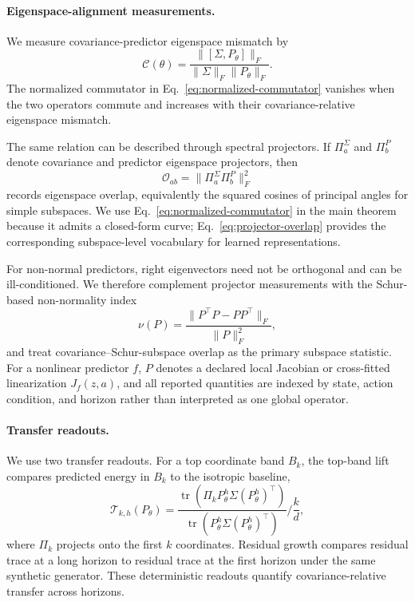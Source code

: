 \documentclass{article}
\DeclareMathOperator{\tr}{tr}
\newcommand{\comm}[2]{[#1,#2]}
\begin{document}
\paragraph{Eigenspace-alignment measurements.}
We measure covariance-predictor eigenspace mismatch by
\begin{equation}
\mathcal{C}(\theta)=
\frac{\|\comm{\Sigma}{P_\theta}\|_F}
{\|\Sigma\|_F\|P_\theta\|_F}.
\label{eq:normalized-commutator}
\end{equation}
The normalized commutator in Eq.~\eqref{eq:normalized-commutator} vanishes when the two operators commute and increases with their covariance-relative eigenspace mismatch.

The same relation can be described through spectral projectors. If $\Pi_a^\Sigma$ and $\Pi_b^P$ denote covariance and predictor eigenspace projectors, then
\begin{equation}
\mathcal{O}_{ab}=\|\Pi_a^\Sigma\Pi_b^P\|_F^2
\label{eq:projector-overlap}
\end{equation}
records eigenspace overlap, equivalently the squared cosines of principal angles for simple subspaces. We use Eq.~\eqref{eq:normalized-commutator} in the main theorem because it admits a closed-form curve; Eq.~\eqref{eq:projector-overlap} provides the corresponding subspace-level vocabulary for learned representations.

For non-normal predictors, right eigenvectors need not be orthogonal and can be
ill-conditioned. We therefore complement projector measurements with the
Schur-based non-normality index
\begin{equation}
\label{eq:nonnormality-index}
\nu(P)=\frac{\|P^\top P-PP^\top\|_F}{\|P\|_F^2},
\end{equation}
and treat covariance--Schur-subspace overlap as the primary subspace statistic.
For a nonlinear predictor $f$, $P$ denotes a declared local Jacobian or
cross-fitted linearization $J_f(z,a)$, and all reported quantities are indexed
by state, action condition, and horizon rather than interpreted as one global
operator.

\paragraph{Transfer readouts.}
We use two transfer readouts. For a top coordinate band $B_k$, the top-band lift compares predicted energy in $B_k$ to the isotropic baseline,
\begin{equation}
\mathcal{T}_{k,h}(P_\theta)=
\frac{\tr(\Pi_k P_\theta^h\Sigma (P_\theta^h)^\top)}
{\tr(P_\theta^h\Sigma (P_\theta^h)^\top)}
\bigg/ \frac{k}{d},
\label{eq:top-band}
\end{equation}
where $\Pi_k$ projects onto the first $k$ coordinates. Residual growth compares residual trace at a long horizon to residual trace at the first horizon under the same synthetic generator. These deterministic readouts quantify covariance-relative transfer across horizons.
\end{document}
